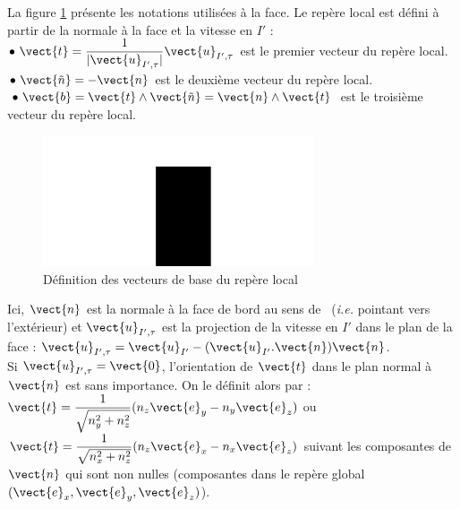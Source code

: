 La figure \ref{Base_Clsyvt_fig_facesym} pr\'esente les notations utilis\'ees \`a la face. Le
rep\`ere local est d\'efini \`a partir de la normale \`a la face et la vitesse
en $I'$ :\\
$\bullet\ \displaystyle\vect{t}
=\frac{1}{|\vect{u}_{I',\tau}|}\vect{u}_{I',\tau}$ est le
premier vecteur du rep\`ere local.\\
$\bullet\ \vect{\tilde{n}}=-\vect{n}$ est le deuxi\`eme vecteur du rep\`ere
local.\\
$\bullet\ \vect{b}=\vect{t}\wedge\vect{\tilde{n}}=\vect{n}\wedge\vect{t}$ est le
troisi\`eme vecteur du rep\`ere local.

\begin{figure}[h]
\centerline{\includegraphics[width=8cm]{../Base/Clsyvt/Images/facesym.pdf}}
\caption{\label{Base_Clsyvt_fig_facesym}D\'efinition des vecteurs de base du rep\`ere local}
\end{figure}

Ici, $\vect{n}$ est la normale \`a la face de bord au sens de \CS\ ({\em i.e.}
pointant vers l'ext\'erieur) et $\vect{u}_{I',\tau}$ est la projection de la
vitesse en $I'$ dans le plan de la face :
$\vect{u}_{I',\tau}=\vect{u}_{I'}-(\vect{u}_{I'}.\vect{n})\vect{n}$.\\
Si $\vect{u}_{I',\tau}=\vect{0}$, l'orientation de $\vect{t}$ dans le plan
normal \`a $\vect{n}$ est sans importance. On le d\'efinit alors par :
$\displaystyle\vect{t}=\frac{1}{\sqrt{n_y^2+n_z^2}}(n_z\vect{e}_y-n_y\vect{e}_z)$
ou
$\displaystyle\vect{t}=\frac{1}{\sqrt{n_x^2+n_z^2}}(n_z\vect{e}_x-n_x\vect{e}_z)$
suivant les composantes de $\vect{n}$ qui sont non nulles (composantes dans le
rep\`ere global $(\vect{e}_x,\vect{e}_y,\vect{e}_z)$).


